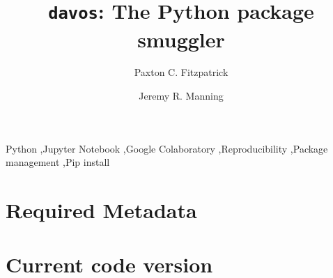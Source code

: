 \documentclass[preprint,12pt, a4paper]{elsarticle}
\begin{document}
\begin{frontmatter}

\title{\texttt{davos}: The Python package smuggler}
\author{Paxton C. Fitzpatrick}
\author{Jeremy R. Manning}
\address{Department of Psychological and Brain Sciences\\Dartmouth College, Hanover, NH 03755}


\begin{abstract}
\end{abstract}


\begin{keyword}
Python \sep Jupyter Notebook \sep Google Colaboratory \sep Reproducibility \sep Package management \sep Pip install
\end{keyword}

\end{frontmatter}


\section*{Required Metadata}

\section*{Current code version}
\end{document}

